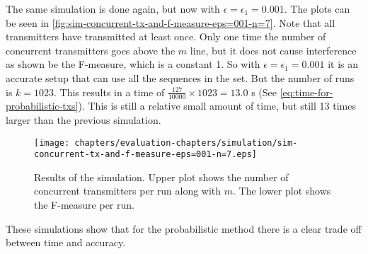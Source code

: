 The same simulation is done again, but now with $\epsilon = \epsilon_1 = 0.001$.
The plots can be seen in \autoref{fig:sim-concurrent-tx-and-f-measure-eps=001-n=7}.
Note that all transmitters have transmitted at least once.
Only one time the number of concurrent transmitters goes above the $m$ line, but it does not cause interference as shown be the F-measure, which is a constant 1.
So with $\epsilon = \epsilon_1 = 0.001$ it is an accurate setup that can use all the sequences in the set.
But the number of runs is $k = 1023$.
This results in a time of $\frac{127}{10000} \times 1023 = 13.0$ s (See \autoref{eq:time-for-probabilistic-txs}).
This is still a relative small amount of time, but still 13 times larger than the previous simulation.


\begin{figure}[tbp]
	\centering
	\texttt{[image: chapters/evaluation-chapters/simulation/sim-concurrent-tx-and-f-measure-eps=001-n=7.eps]}
	\caption{Results of the simulation. Upper plot shows the number of concurrent transmitters per run along with $m$. The lower plot shows the F-measure per run.}
	\label{fig:sim-concurrent-tx-and-f-measure-eps=001-n=7}
\end{figure}

 

These simulations show that for the probabilistic method there is a clear trade off between time and accuracy.